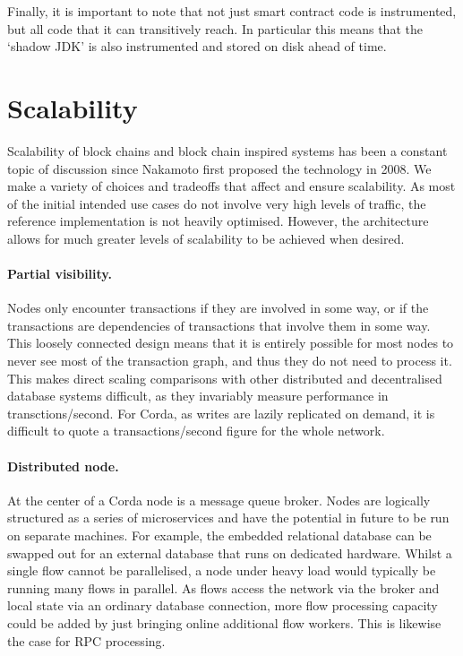 \documentclass{article}
\begin{document}
Finally, it is important to note that not just smart contract code is instrumented, but all code that it can transitively
reach. In particular this means that the `shadow JDK' is also instrumented and stored on disk ahead of time.

\section{Scalability}

Scalability of block chains and block chain inspired systems has been a constant topic of discussion since Nakamoto
first proposed the technology in 2008. We make a variety of choices and tradeoffs that affect and
ensure scalability. As most of the initial intended use cases do not involve very high levels of traffic, the
reference implementation is not heavily optimised. However, the architecture allows for much greater levels of
scalability to be achieved when desired.

\paragraph{Partial visibility.}Nodes only encounter transactions if they are involved in some way, or if the
transactions are dependencies of transactions that involve them in some way. This loosely connected
design means that it is entirely possible for most nodes to never see most of the transaction graph, and thus
they do not need to process it. This makes direct scaling comparisons with other distributed and
decentralised database systems difficult, as they invariably measure performance in transctions/second.
For Corda, as writes are lazily replicated on demand, it is difficult to quote a transactions/second figure for
the whole network.

\paragraph{Distributed node.}At the center of a Corda node is a message queue broker. Nodes are logically structured
as a series of microservices and have the potential in future to be run on separate machines. For example, the
embedded relational database can be swapped out for an external database that runs on dedicated hardware. Whilst
a single flow cannot be parallelised, a node under heavy load would typically be running many flows in parallel.
As flows access the network via the broker and local state via an ordinary database connection, more flow processing
capacity could be added by just bringing online additional flow workers. This is likewise the case for RPC processing.
\end{document}
